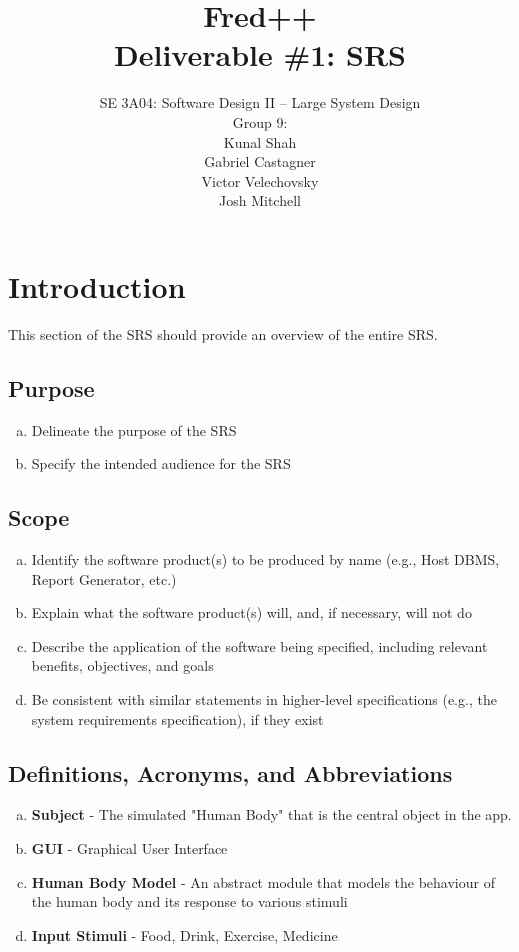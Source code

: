 \documentclass[]{article}
\title{Fred++\\Deliverable \#1: SRS}
\author{SE 3A04: Software Design II -- Large System Design\\Group 9:\\Kunal 
Shah\\Gabriel Castagner\\Victor Velechovsky\\Josh Mitchell}
\date{}
\begin{document}
\maketitle	

\section{Introduction}
\label{sec:introduction}

This section of the SRS should provide an overview of the entire SRS.

\subsection{Purpose}
\label{sub:purpose}
\begin{enumerate}[a)]
	\item Delineate the purpose of the SRS
	\item Specify the intended audience for the SRS
\end{enumerate}

\subsection{Scope}
\label{sub:scope}
\begin{enumerate}[a)]
	\item Identify the software product(s) to be produced by name (e.g., Host DBMS, Report Generator, etc.)
	\item Explain what the software product(s) will, and, if necessary, will not do
	\item Describe the application of the software being specified, including relevant benefits, objectives, and goals
	\item Be consistent with similar statements in higher-level specifications (e.g., the system requirements specification), if they exist
\end{enumerate}

\subsection{Definitions, Acronyms, and Abbreviations}
\label{sub:definitions_acronyms_and_abbreviations}
\begin{enumerate}[a)]
	\item \textbf{Subject} - The simulated "Human Body" that is the central object in the app.
    \item \textbf{GUI} - Graphical User Interface
    \item \textbf{Human Body Model} - An abstract module that models the behaviour of the human body and its response to various stimuli
    \item \textbf{Input Stimuli} - Food, Drink, Exercise, Medicine
\end{enumerate}
\end{document}
